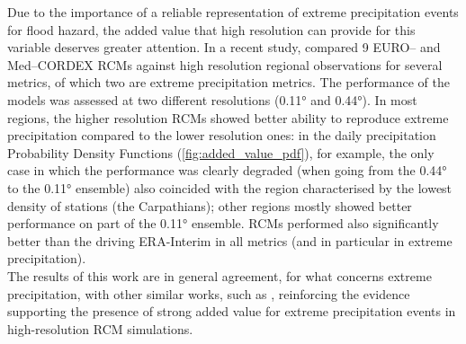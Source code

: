 Due to the importance of a reliable representation of extreme precipitation events for flood hazard, the added value that high resolution can provide for this variable deserves greater attention.
In a recent study, \citet{Fantini2016} compared 9 EURO-- and Med--CORDEX RCMs against high resolution regional observations for several metrics, of which two are extreme precipitation metrics.
The performance of the models was assessed at two different resolutions (\ang{0.11} and \ang{0.44}).
In most regions, the higher resolution RCMs showed better ability to reproduce extreme precipitation compared to the lower resolution ones: in the daily precipitation Probability Density Functions  (\cref{fig:added_value_pdf}), for example, the only case in which the performance was clearly degraded (when going from the \ang{0.44} to the \ang{0.11} ensemble) also coincided with the region characterised by the lowest density of stations (the Carpathians); other regions mostly showed better performance on part of the \ang{0.11} ensemble.
RCMs performed also significantly better than the driving ERA-Interim \citep{Dee2011} in all metrics (and in particular in extreme precipitation).\\
The results of this work are in general agreement, for what concerns extreme precipitation, with other similar works, such as \citet{diluca2012PotaddvalpresimbyhignesRegCliModobs, Lucas-Picher2017, Prein2016, Torma2015, Casanueva2016}, reinforcing the evidence supporting the presence of strong added value for extreme precipitation events in high-resolution RCM simulations.
